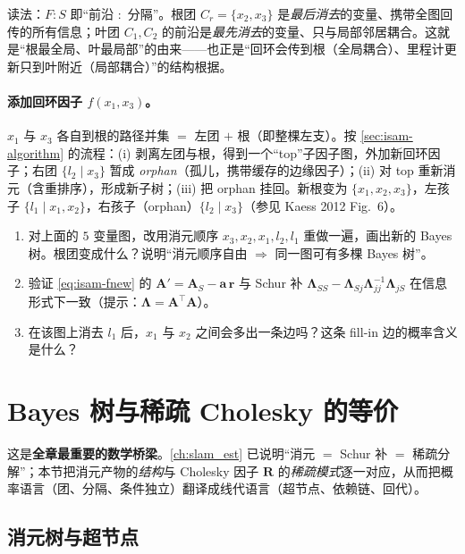\noindent 读法：$F:S$ 即“前沿 $:$ 分隔”。根团 $C_r=\{x_2,x_3\}$ 是\emph{最后消去}的变量、携带全图回传的所有信息；叶团 $C_1,C_2$ 的前沿是\emph{最先消去}的变量、只与局部邻居耦合。这就是“根最全局、叶最局部”的由来——也正是“回环会传到根（全局耦合）、里程计更新只到叶附近（局部耦合）”的结构根据。

\paragraph{添加回环因子 $f(x_1,x_3)$。}
$x_1$ 与 $x_3$ 各自到根的路径并集 $=$ 左团 $+$ 根（即整棵左支）。按 \cref{sec:isam-algorithm} 的流程：(i) 剥离左团与根，得到一个“top”子因子图，外加新回环因子；右团 $\{l_2\mid x_3\}$ 暂成 \emph{orphan}（孤儿，携带缓存的边缘因子）；(ii) 对 top 重新消元（含重排序），形成新子树；(iii) 把 orphan 挂回。新根变为 $\{x_1,x_2,x_3\}$，左孩子 $\{l_1\mid x_1,x_2\}$，右孩子（orphan）$\{l_2\mid x_3\}$（参见 Kaess 2012 Fig.~6\cite{kaess2012isam2}）。

\begin{practice}
\begin{enumerate}
  \item 对上面的 $5$ 变量图，改用消元顺序 $x_3,x_2,x_1,l_2,l_1$ 重做一遍，画出新的 Bayes 树。根团变成什么？说明“消元顺序自由 $\Rightarrow$ 同一图可有多棵 Bayes 树”。
  \item 验证 \cref{eq:isam-fnew} 的 $\mathbf{A}'=\mathbf{A}_S-\mathbf{a}\,\mathbf{r}$ 与 Schur 补 $\boldsymbol{\Lambda}_{SS}-\boldsymbol{\Lambda}_{Sj}\boldsymbol{\Lambda}_{jj}^{-1}\boldsymbol{\Lambda}_{jS}$ 在信息形式下一致（提示：$\boldsymbol{\Lambda}=\mathbf{A}^\top\mathbf{A}$）。
  \item 在该图上消去 $l_1$ 后，$x_1$ 与 $x_2$ 之间会多出一条边吗？这条 fill-in 边的概率含义是什么？
\end{enumerate}
\end{practice}

\section{Bayes 树与稀疏 Cholesky 的等价}
\label{sec:isam-equiv}

这是\textbf{全章最重要的数学桥梁}。\cref{ch:slam_est} 已说明“消元 $=$ Schur 补 $=$ 稀疏分解”；本节把消元产物的\emph{结构}与 Cholesky 因子 $\mathbf{R}$ 的\emph{稀疏模式}逐一对应，从而把概率语言（团、分隔、条件独立）翻译成线代语言（超节点、依赖链、回代）。

\subsection{消元树与超节点}
\label{sec:isam-etree}

